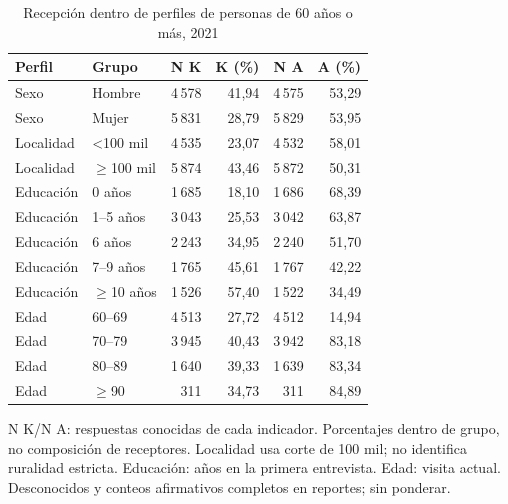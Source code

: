 \begin{table}[!htbp]
\centering
\caption{Recepción dentro de perfiles de personas de 60 años o más, 2021}\label{tab:proteccion-perfiles}
\small\setlength{\tabcolsep}{4pt}
\renewcommand{\arraystretch}{1.15}
\begin{tabular}{llrrrr}
\toprule
\textbf{Perfil} & \textbf{Grupo} & \textbf{N K} & \textbf{K (\%)} & \textbf{N A} & \textbf{A (\%)} \\
\midrule
Sexo & Hombre & 4\,578 & 41,94 & 4\,575 & 53,29 \\
Sexo & Mujer & 5\,831 & 28,79 & 5\,829 & 53,95 \\
Localidad & <100 mil & 4\,535 & 23,07 & 4\,532 & 58,01 \\
Localidad & $\geq$100 mil & 5\,874 & 43,46 & 5\,872 & 50,31 \\
Educación & 0 años & 1\,685 & 18,10 & 1\,686 & 68,39 \\
Educación & 1--5 años & 3\,043 & 25,53 & 3\,042 & 63,87 \\
Educación & 6 años & 2\,243 & 34,95 & 2\,240 & 51,70 \\
Educación & 7--9 años & 1\,765 & 45,61 & 1\,767 & 42,22 \\
Educación & $\geq$10 años & 1\,526 & 57,40 & 1\,522 & 34,49 \\
Edad & 60--69 & 4\,513 & 27,72 & 4\,512 & 14,94 \\
Edad & 70--79 & 3\,945 & 40,43 & 3\,942 & 83,18 \\
Edad & 80--89 & 1\,640 & 39,33 & 1\,639 & 83,34 \\
Edad & $\geq$90 & 311 & 34,73 & 311 & 84,89 \\
\bottomrule
\end{tabular}
\par\medskip
\parbox{\linewidth}{\footnotesize N K/N A: respuestas conocidas de cada indicador. Porcentajes dentro de grupo, no composición de receptores. Localidad usa corte de 100 mil; no identifica ruralidad estricta. Educación: años en la primera entrevista. Edad: visita actual. Desconocidos y conteos afirmativos completos en reportes; sin ponderar.}
\end{table}
